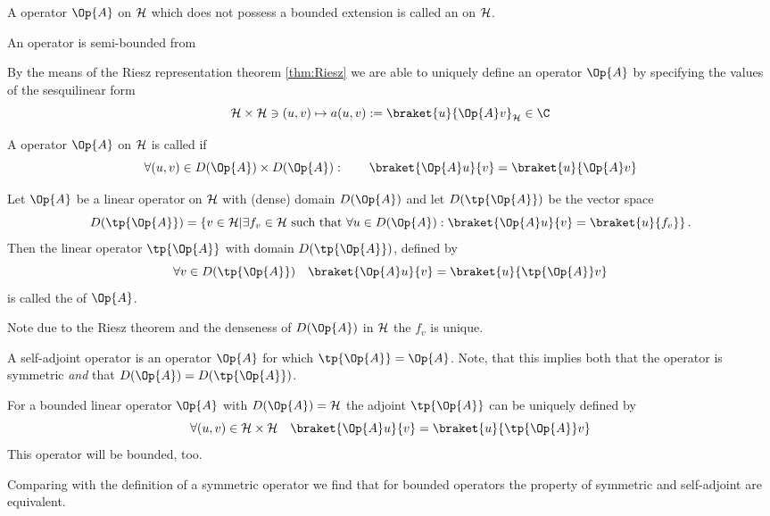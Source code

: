 \begin{defn}
	A operator $\Op{A}$ on $\mathcal{H}$ which does not possess
	a bounded extension is called an  on $\mathcal{H}$.
\end{defn}

\begin{defn}
	An operator is semi-bounded from
\end{defn}

\begin{rem}
By the means of the Riesz representation theorem \vref{thm:Riesz}
we are able to uniquely define an operator $\Op{A}$ by
specifying the values of the sesquilinear form
\begin{equation}
	\hilbert \times \hilbert \ni (u, v) \mapsto a(u, v) := \braket{u}{\Op{A} v}_\hilbert \in \C
	\label{eqn:formA}
\end{equation}
\end{rem}

\begin{defn}
	A operator $\Op{A}$ on $\mathcal{H}$ is called  if
	\[ \forall (u, v) \in D(\Op{A}) \times D(\Op{A}): \qquad \braket{\Op{A} u}{v} = \braket{u}{\Op{A} v} \]
\end{defn}

\begin{defn}
	Let $\Op{A}$ be a linear operator on $\mathcal{H}$ with (dense) domain $D(\Op{A})$
	and let $D(\tp{\Op{A}})$ be the vector space
	\[ D(\tp{\Op{A}}) = \left\{ v \in \hilbert \middle|
		\exists f_v \in \hilbert \ \text{such that} \
		\forall u \in D(\Op{A}): \braket{\Op{A} u}{v} = \braket{u}{f_v} \right\}.
	\]
	Then the linear operator $\tp{\Op{A}}$ with domain $D(\tp{\Op{A}})$,
	defined by
	\[ \forall v \in D(\tp{\Op{A}}) \quad \braket{\Op{A} u}{v} = \braket{u}{\tp{\Op{A}} v} \]
	is called the \newterm{adjoint} of $\Op{A}$.
\end{defn}
Note due to the Riesz theorem and the denseness of $D(\Op{A})$ in $\mathcal{H}$
the $f_v$ is unique.

\begin{defn}
	A self-adjoint operator is an operator $\Op{A}$ for which $\tp{\Op{A}} = \Op{A}$.
	Note, that this implies both that the operator is symmetric \emph{and}
	that $D(\Op{A}) = D(\tp{\Op{A}})$.
\end{defn}

\begin{rem}
	For a bounded linear operator $\Op{A}$ with $D(\Op{A}) = \hilbert$
	the adjoint $\tp{\Op{A}}$ can be uniquely defined by
	\[ \forall (u,v) \in \hilbert \times \hilbert \quad \braket{\Op{A} u}{v} = \braket{u}{\tp{\Op{A}} v} \]
	This operator will be bounded, too.

	Comparing with the definition of a symmetric operator we find that for
	bounded operators the property of symmetric and self-adjoint are equivalent.
\end{rem}

